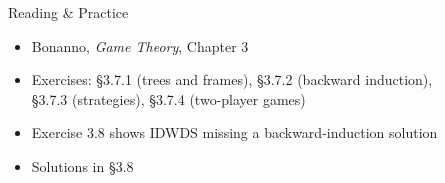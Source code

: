 \begin{frame}{Reading \& Practice}
\begin{itemize}
    \item Bonanno, \textit{Game Theory}, Chapter 3
    \item Exercises: \S3.7.1 (trees and frames), \S3.7.2 (backward induction),\\
      \S3.7.3 (strategies), \S3.7.4 (two-player games)
    \item Exercise 3.8 shows IDWDS missing a backward-induction solution
    \item Solutions in \S3.8
\end{itemize}
\vfill
\end{frame}


